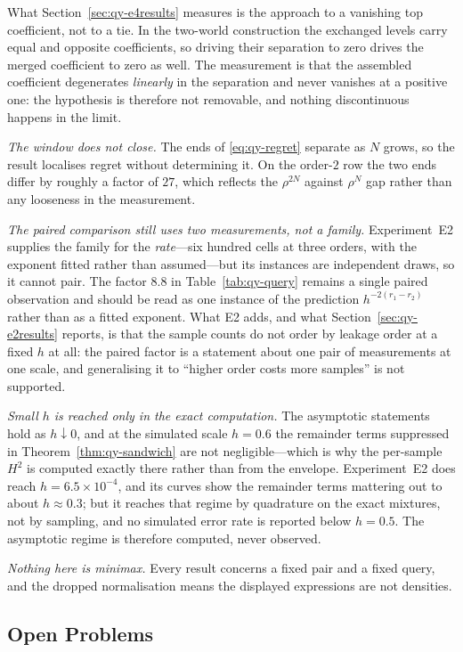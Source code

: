 What Section~\ref{sec:qy-e4results} measures is the approach to a vanishing top coefficient, not
to a tie. In the two-world construction the exchanged levels carry equal and opposite
coefficients, so driving their separation to zero drives the merged coefficient to zero as
well. The measurement is that the assembled coefficient degenerates \emph{linearly} in the
separation and never vanishes at a positive one: the hypothesis is therefore not removable,
and nothing discontinuous happens in the limit.

\emph{The window does not close.} The ends of \eqref{eq:qy-regret} separate as $N$ grows, so the
result localises regret without determining it. On the order-$2$ row the two ends differ by
roughly a factor of $27$, which reflects the $\rho^{2N}$ against $\rho^{N}$ gap rather than
any looseness in the measurement.

\emph{The paired comparison still uses two measurements, not a family.} Experiment~E2 supplies
the family for the \emph{rate}---six hundred cells at three orders, with the exponent fitted
rather than assumed---but its instances are independent draws, so it cannot pair. The factor
$8.8$ in Table~\ref{tab:qy-query} remains a single paired observation and should be read as one
instance of the prediction $h^{-2(r_{1}-r_{2})}$ rather than as a fitted exponent. What E2
adds, and what Section~\ref{sec:qy-e2results} reports, is that the sample counts do not order by
leakage order at a fixed $h$ at all: the paired factor is a statement about one pair of
measurements at one scale, and generalising it to ``higher order costs more samples'' is not
supported.

\emph{Small $h$ is reached only in the exact computation.} The asymptotic statements hold as
$h\downarrow0$, and at the simulated scale $h=0.6$ the remainder terms suppressed in
Theorem~\ref{thm:qy-sandwich} are not negligible---which is why the per-sample $H^{2}$ is computed
exactly there rather than from the envelope. Experiment~E2 does reach $h=6.5\times10^{-4}$, and
its curves show the remainder terms mattering out to about $h\approx0.3$; but it reaches that
regime by quadrature on the exact mixtures, not by sampling, and no simulated error rate is
reported below $h=0.5$. The asymptotic regime is therefore computed, never observed.

\emph{Nothing here is minimax.} Every result concerns a fixed pair and a fixed query, and
the dropped normalisation means the displayed expressions are not densities.

\subsection{Open Problems}

